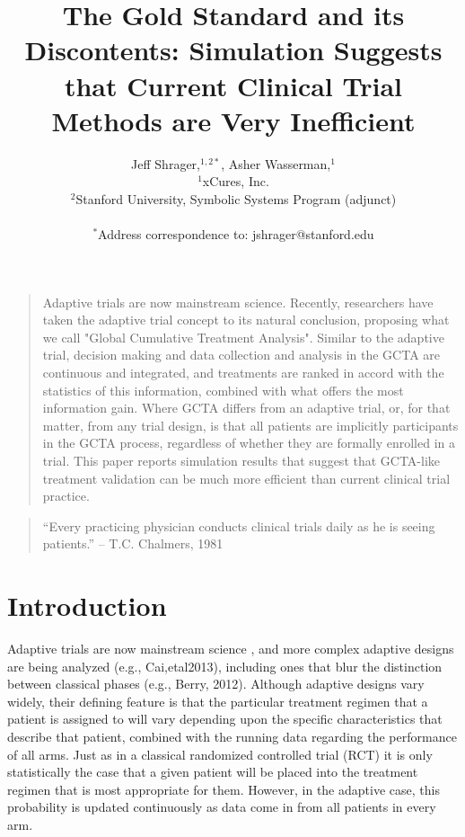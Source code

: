 \documentclass[12pt]{article}
\title{The Gold Standard and its Discontents: Simulation Suggests that
  Current Clinical Trial Methods are Very Inefficient}
\author
{Jeff Shrager,$^{1,2\ast}$, Asher Wasserman,$^{1}$
\\
\normalsize{$^{1}$xCures, Inc.}\\
\normalsize{$^{2}$Stanford University, Symbolic Systems Program (adjunct)}\\
\\
\normalsize{$^\ast$Address correspondence to: jshrager@stanford.edu}
}
\date{}
\newenvironment{sciabstract}{%
\begin{quote} \bf}
{\end{quote}}
\begin{document}
 

\baselineskip24pt 
\maketitle 

\begin{sciabstract}

Adaptive trials are now mainstream science. Recently, researchers have
taken the adaptive trial concept to its natural conclusion, proposing
what we call "Global Cumulative Treatment
Analysis"\cite{shrager_theoretical_2013, shrager_rapid_2014}. Similar
to the adaptive trial, decision making and data collection and
analysis in the GCTA are continuous and integrated, and treatments are
ranked in accord with the statistics of this information, combined
with what offers the most information gain. Where GCTA differs from an
adaptive trial, or, for that matter, from any trial design, is that
all patients are implicitly participants in the GCTA process,
regardless of whether they are formally enrolled in a trial. This
paper reports simulation results that suggest that GCTA-like treatment
validation can be much more efficient than current clinical trial
practice.

\end{sciabstract}

\clearpage

\begin{quote}
 “Every practicing physician conducts clinical trials daily as he is seeing patients.”
 -- T.C. Chalmers, 1981
\end{quote}

\section*{Introduction}

Adaptive trials are now mainstream science \cite{Galloetal2006,
  Fioreetal2011, Kimetal2011; Berry, 2012; DAvolioetal2012}, and more
complex adaptive designs are being analyzed (e.g., Cai,etal2013),
including ones that blur the distinction between classical phases
(e.g., Berry, 2012). Although adaptive designs vary widely, their
defining feature is that the particular treatment regimen that a
patient is assigned to will vary depending upon the specific
characteristics that describe that patient, combined with the running
data regarding the performance of all arms. Just as in a classical
randomized controlled trial (RCT) it is only statistically the case
that a given patient will be placed into the treatment regimen that is
most appropriate for them. However, in the adaptive case, this
probability is updated continuously as data come in from all patients
in every arm.
\end{document}
